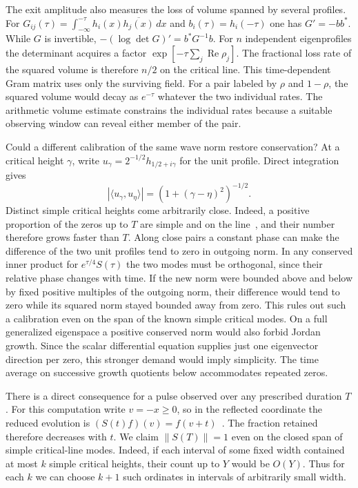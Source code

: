 \documentclass[11pt,letterpaper]{article}
\numberwithin{equation}{section}
\begin{document}
The exit amplitude also measures the loss of volume spanned by several profiles. For $G_{ij}(\tau)=\int_{-\infty}^{-\tau}h_i(x)\overline{h_j(x)}\,dx$ and $b_i(\tau)=h_i(-\tau)$ one has $G'=-bb^*$. While $G$ is invertible, $-(\log\det G)'=b^*G^{-1}b$. For $n$ independent eigenprofiles the determinant acquires a factor $\exp[-\tau\sum_j\operatorname{Re}\rho_j]$. The fractional loss rate of the squared volume is therefore $n/2$ on the critical line. This time-dependent Gram matrix uses only the surviving field. For a pair labeled by $\rho$ and $1-\rho$, the squared volume would decay as $e^{-\tau}$ whatever the two individual rates. The arithmetic volume estimate constrains the individual rates because a suitable observing window can reveal either member of the pair.

Could a different calibration of the same wave norm restore conservation? At a critical height $\gamma$, write $u_\gamma=2^{-1/2}h_{1/2+i\gamma}$ for the unit profile. Direct integration gives
\[
 |\langle u_\gamma,u_\eta\rangle|=(1+(\gamma-\eta)^2)^{-1/2}.
\]
Distinct simple critical heights come arbitrarily close. Indeed, a positive proportion of the zeros up to $T$ are simple and on the line~\cite[Theorem~1.1]{bcy}, and their number therefore grows faster than $T$. Along close pairs a constant phase can make the difference of the two unit profiles tend to zero in outgoing norm. In any conserved inner product for $e^{\tau/4}S(\tau)$ the two modes must be orthogonal, since their relative phase changes with time. If the new norm were bounded above and below by fixed positive multiples of the outgoing norm, their difference would tend to zero while its squared norm stayed bounded away from zero. This rules out such a calibration even on the span of the known simple critical modes. On a full generalized eigenspace a positive conserved norm would also forbid Jordan growth. Since the scalar differential equation supplies just one eigenvector direction per zero, this stronger demand would imply simplicity. The time average on successive growth quotients below accommodates repeated zeros.

There is a direct consequence for a pulse observed over any prescribed duration $T$. For this computation write $v=-x\geq0$, so in the reflected coordinate the reduced evolution is $(S(t)f)(v)=f(v+t)$~\cite[Theorem~5.1]{uetake}. The fraction retained therefore decreases with $t$. We claim $\|S(T)\|=1$ even on the closed span of simple critical-line modes. Indeed, if each interval of some fixed width contained at most $k$ simple critical heights, their count up to $Y$ would be $O(Y)$. Thus for each $k$ we can choose $k+1$ such ordinates in intervals of arbitrarily small width.
\end{document}

